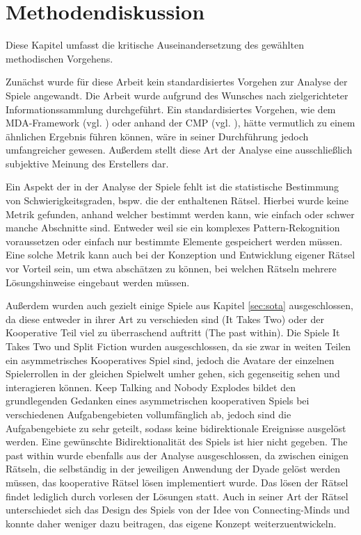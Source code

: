 \section{Methodendiskussion}\label{sec:analysis-discussion}
Diese Kapitel umfasst die kritische Auseinandersetzung des gewählten methodischen Vorgehens.

Zunächst wurde für diese Arbeit kein standardisiertes Vorgehen zur Analyse der Spiele angewandt. Die Arbeit wurde aufgrund des Wunsches nach zielgerichteter Informationssammlung durchgeführt. Ein standardisiertes Vorgehen, wie dem \ac{MDA}-Framework (vgl. \cite{hunicke_mda_2004}) oder anhand der \ac{CMP} (vgl. \cite{seif_el-nasr_understanding_2010}), hätte vermutlich zu einem ähnlichen Ergebnis führen können, wäre in seiner Durchführung jedoch umfangreicher gewesen.
Außerdem stellt diese Art der Analyse eine ausschließlich subjektive Meinung des Erstellers dar.

Ein Aspekt der in der Analyse der Spiele fehlt ist die statistische Bestimmung von Schwierigkeitsgraden, bspw. die der enthaltenen Rätsel. Hierbei wurde keine Metrik gefunden, anhand welcher bestimmt werden kann, wie einfach oder schwer manche Abschnitte sind. Entweder weil sie ein komplexes Pattern-Rekognition voraussetzen oder einfach nur bestimmte Elemente gespeichert werden müssen. Eine solche Metrik kann auch bei der Konzeption und Entwicklung eigener Rätsel vor Vorteil sein, um etwa abschätzen zu können, bei welchen Rätseln mehrere Lösungshinweise eingebaut werden müssen.

Außerdem wurden auch gezielt einige Spiele aus Kapitel \ref{sec:sota} ausgeschlossen, da diese entweder in ihrer Art zu verschieden sind (It Takes Two) oder der Kooperative Teil viel zu überraschend auftritt (The past within). Die Spiele It Takes Two und Split Fiction wurden ausgeschlossen, da sie zwar in weiten Teilen ein asymmetrisches Kooperatives Spiel sind, jedoch die Avatare der einzelnen Spielerrollen in der gleichen Spielwelt umher gehen, sich gegenseitig sehen und interagieren können. Keep Talking and Nobody Explodes bildet den grundlegenden Gedanken eines asymmetrischen kooperativen Spiels bei verschiedenen Aufgabengebieten vollumfänglich ab, jedoch sind die Aufgabengebiete zu sehr geteilt, sodass keine bidirektionale Ereignisse ausgelöst werden. Eine gewünschte Bidirektionalität des Spiels ist hier nicht gegeben. The past within wurde ebenfalls aus der Analyse ausgeschlossen, da zwischen einigen Rätseln, die selbständig in der jeweiligen Anwendung der Dyade gelöst werden müssen, das kooperative Rätsel lösen implementiert wurde. Das lösen der Rätsel findet lediglich durch vorlesen der Lösungen statt.  Auch in seiner Art der Rätsel unterschiedet sich das Design des Spiels von der Idee von Connecting-Minds und konnte daher weniger dazu beitragen, das eigene Konzept weiterzuentwickeln.

